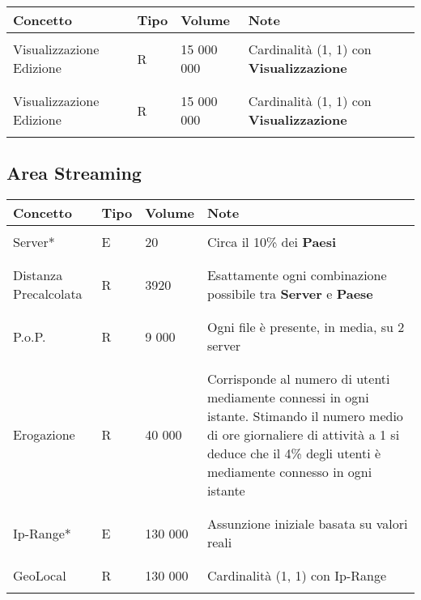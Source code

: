 \documentclass{article}
\begin{document}
%
%
%
%
%
%
%
%
\begin{tabular}{|C{2.3cm}|C{0.7cm}|C{1.7cm}|C{6.2cm}|}
\hline
    \textbf{Concetto} & \textbf{Tipo} & \textbf{Volume} & \textbf{Note} \\
\hline
\hline
& & & \\    
    Visualizzazione Edizione & R & 15 000 000 & Cardinalità (1, 1) con \textbf{Visualizzazione} \\
& & & \\
\hline
& & & \\    
    Visualizzazione Edizione & R & 15 000 000 & Cardinalità (1, 1) con \textbf{Visualizzazione} \\
& & & \\
\hline
\end{tabular}
\subsection{Area Streaming}
\begin{tabular}{|C{2.3cm}|C{0.7cm}|C{1.7cm}|C{6.2cm}|}
\hline
    \textbf{Concetto} & \textbf{Tipo} & \textbf{Volume} & \textbf{Note} \\
\hline
\hline
& & & \\
    Server* & E & 20 & Circa il 10\% dei \textbf{Paesi} \\
& & & \\
\hline
& & & \\    
    Distanza Precalcolata & R & 3920 & Esattamente ogni combinazione possibile tra \textbf{Server} e \textbf{Paese} \\
& & & \\
\hline
& & & \\    
    P.o.P. & R & 9 000 & Ogni file è presente, in media, su 2 server \\
& & & \\
\hline
& & & \\    
    Erogazione & R & 40 000 & Corrisponde al numero di utenti mediamente connessi in ogni istante. Stimando il numero medio di ore giornaliere di attività a 1 si deduce che il 4\% degli utenti è mediamente connesso in ogni istante \\
& & & \\
\hline
& & & \\    
    Ip-Range* & E & 130 000 & Assunzione iniziale basata su valori reali \\
& & & \\
\hline
& & & \\    
    GeoLocal & R & 130 000 & Cardinalità (1, 1) con Ip-Range \\
& & & \\
\hline
\end{tabular}
\end{document}
